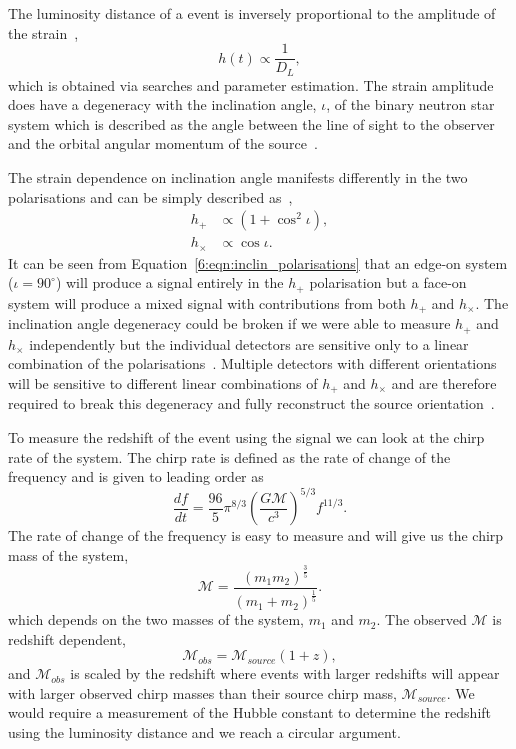 The luminosity distance of a \gwadj event is inversely proportional to the amplitude of the \gwadj strain~\cite{Schutz:1986},%
\begin{equation}
    h(t) \propto \frac{1}{D_{L}} , 
\end{equation}
%
which is obtained via \gwadj searches and parameter estimation. The \gwadj strain amplitude does have a degeneracy with the inclination angle, $\iota$, of the binary neutron star system which is described as the angle between the line of sight to the observer and the orbital angular momentum of the source~\cite{inclin_degen_2:2019}.

The \gwadj strain dependence on inclination angle manifests differently in the two \gwadj polarisations and can be simply described as~\cite{inclin_degen:2018},
%
\begin{align}
    h_{+} &\propto \left(1+\cos^{2}\iota\right), \\
    h_{\times} &\propto \cos\iota .
    \label{6:eqn:inclin_polarisations}
\end{align}
%
It can be seen from Equation~\ref{6:eqn:inclin_polarisations} that an edge-on system ($\iota = 90^{\circ}$) will produce a signal entirely in the $h_{+}$ polarisation but a face-on system will produce a mixed signal with contributions from both $h_{+}$ and $h_{\times}$. The inclination angle degeneracy could be broken if we were able to measure $h_{+}$ and $h_{\times}$ independently but the individual \gwadj detectors are sensitive only to a linear combination of the polarisations~\cite{aLIGO:2015}. Multiple \gwadj detectors with different orientations will be sensitive to different linear combinations of $h_{+}$ and $h_{\times}$ and are therefore required to break this degeneracy and fully reconstruct the source orientation~\cite{inclin_degen_2:2019}.

To measure the redshift of the event using the \gwadj signal we can look at the chirp rate of the system. The chirp rate is defined as the rate of change of the \gwadj frequency and is given to leading order as~\cite{Jaranowski:2009}
%
\begin{equation}
    \frac{df}{dt} = \frac{96}{5} \pi^{8/3} \left(\frac{G\mathcal{M}}{c^{3}}\right)^{5/3} f^{11/3}.
    \label{6:eq:chirp_rate}
\end{equation}
%
The rate of change of the \gwadj frequency is easy to measure and will give us the chirp mass of the system,
%
\begin{equation}
    \mathcal{M} = \frac{(m_1 m_2)^{\frac{3}{5}}}{(m_1 + m_2)^{\frac{1}{5}}}.
    \label{6:eq:mchirp}
\end{equation}
%
which depends on the two masses of the system, $m_{1}$ and $m_{2}$. The observed $\mathcal{M}$ is redshift dependent,
%
\begin{equation}
    \mathcal{M}_{obs} = \mathcal{M}_{source}(1 + z), 
    \label{6:eq:mchirp_obs}
\end{equation}
and $\mathcal{M}_{obs}$ is scaled by the redshift where events with larger redshifts will appear with larger observed chirp masses than their source chirp mass, $\mathcal{M}_{source}$. We would require a measurement of the Hubble constant to determine the redshift using the luminosity distance and we reach a circular argument.

